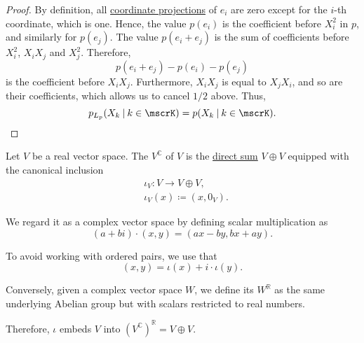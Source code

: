 \begin{proof}
  By definition, all \hyperref[def:basis_decomposition]{coordinate projections} of \( e_i \) are zero except for the \( i \)-th coordinate, which is one. Hence, the value \( p(e_i) \) is the coefficient before \( X_i^2 \) in \( p \), and similarly for \( p(e_j) \). The value \( p(e_i + e_j) \) is the sum of coefficients before \( X_i^2 \), \( X_i X_j \) and \( X_j^2 \). Therefore,
  \begin{equation*}
    p(e_i + e_j) - p(e_i) - p(e_j)
  \end{equation*}
  is the coefficient before \( X_i X_j \). Furthermore, \( X_i X_j \) is equal to \( X_j X_i \), and so are their coefficients, which allows us to cancel \( 1 / 2 \) above. Thus,
  \begin{equation*}
    p_{L_p}(X_k \given k \in \mscrK) = p(X_k \given k \in \mscrK).
  \end{equation*}
\end{proof}

\begin{definition}\label{def:complexification}
  Let \( V \) be a real vector space. The  \( V^\BbbC \) of \( V \) is the \hyperref[def:first_order_direct_product]{direct sum} \( V \oplus V \) equipped with the canonical inclusion
  \begin{equation*}
    \begin{aligned}
      &\iota_V: V \to V \oplus V, \\
      &\iota_V(x) \coloneqq (x, 0_V).
    \end{aligned}
  \end{equation*}

  We regard it as a complex vector space by defining scalar multiplication as
  \begin{equation*}
    (a + bi) \cdot (x, y) = (ax - by, bx + ay).
  \end{equation*}

  To avoid working with ordered pairs, we use that
  \begin{equation*}
    (x, y) = \iota(x) + i \cdot \iota(y).
  \end{equation*}

  Conversely, given a complex vector space \( W \), we define its  \( W^\BbbR \) as the same underlying Abelian group but with scalars restricted to real numbers.

  Therefore, \( \iota \) embeds \( V \) into \( (V^\BbbC)^\BbbR = V \oplus V \).
\end{definition}


